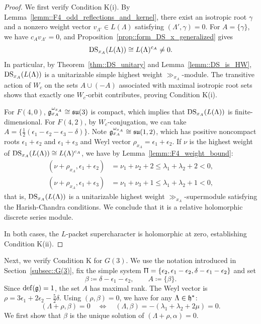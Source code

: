 \begin{proof}

We first verify Condition K(i). By Lemma~\ref{lemm::F4_odd_reflections_and_kernel}, there exist an isotropic root $\gamma$ and a nonzero weight vector $v_{\Lambda'}\in L(\Lambda)$ satisfying $(\Lambda',\gamma)=0$. For $A=\{\gamma\}$, we have $c_Av_{\Lambda'}=0$, and Proposition~\ref{prop::form_DS_x_generalized} gives
\begin{equation}
\operatorname{DS}_{x_A}(L(\Lambda))\cong L(\Lambda)^{c_A}\neq0.
\end{equation}
In particular, by Theorem~\ref{thm::DS_unitary} and Lemma~\ref{lemm::DS_is_HW}, $\operatorname{DS}_{x_{A}}(L(\Lambda))$ is a unitarizable simple highest weight $\gg_{x_{A}}$-module. The transitive action of $W_c$ on the sets $A\cup(-A)$ associated with maximal isotropic root sets shows that exactly one $W_c$-orbit contributes, proving Condition K(i).


For $F(4,0)$, ${\mathfrak{g}}_{x_A}^{\omega_{x_A}}\cong{\mathfrak{su}}(3)$ is compact, which implies that $\operatorname{DS}_{x_A}(L(\Lambda))$ is finite-dimensional. For $F(4,2)$, by $W_{c}$-conjugation, we can take $A=\{\frac12(\epsilon_1-\epsilon_2-\epsilon_3-\delta)\}$. Note ${\mathfrak{g}}_{x_{A}}^{\omega_{x_{A}}}\cong{\mathfrak{su}}(1,2)$, which has positive noncompact roots $\epsilon_1+\epsilon_2$ and $\epsilon_1+\epsilon_3$ and Weyl vector $\rho_{x_A}=\epsilon_1+\epsilon_2$. If $\nu$ is the highest weight of $\operatorname{DS}_{x_A}(L(\Lambda))\cong L(\Lambda)^{c_{A}}$, we have by Lemma~\ref{lemm::F4_weight_bound}:
\[
\begin{aligned}
(\nu+\rho_{x_A},\epsilon_1+\epsilon_2)
&=\nu_1+\nu_2+2
\leq\lambda_1+\lambda_2+2<0,\\
(\nu+\rho_{x_A},\epsilon_1+\epsilon_3)
&=\nu_1+\nu_3+1
\leq\lambda_1+\lambda_2+1<0,
\end{aligned}
\]
that is, $\operatorname{DS}_{x_{A}}(L(\Lambda))$ is a unitarizable highest weight $\gg_{x_{A}}$-supermodule satisfying the Harish-Chandra conditions. We conclude that it is a relative holomorphic discrete series module. 

In both cases, the $L$-packet supercharacter is holomorphic at zero, establishing Condition K(ii).
\end{proof}



Next, we verify Condition K for $G(3)$. We use the notation introduced in Section~\ref{subsec::G(3)}, fix the simple system
$
\Uppi=\{\epsilon_2,\epsilon_1-\epsilon_2,\delta-\epsilon_1-\epsilon_2\}
$
and set
\begin{equation}
\beta\coloneqq\delta-\epsilon_1-\epsilon_2,
\qquad
A\coloneqq\{\beta\}.
\end{equation}
Since ${\mathrm{def}}({\mathfrak{g}})=1$, the set $A$ has maximal rank. The Weyl vector is
$\rho=3\epsilon_1+2\epsilon_2-\frac52\delta$.
Using $(\rho,\beta)=0$, we have for any $\Lambda\in {\mathfrak h}^{\ast}$: \begin{equation}
(\Lambda+\rho,\beta)=0
\quad\Longleftrightarrow\quad
(\Lambda,\beta)=-(\lambda_1+\lambda_2+2\mu)=0.
\end{equation}
We first show that $\beta$ is the unique solution of $(\Lambda+\rho,\alpha)=0$.

